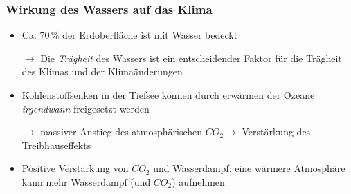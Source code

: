\begin{frame}
	\frametitle{Wirkung des Wassers auf das Klima}
	\begin{itemize}
	\item Ca. 70\,\% der Erdoberfläche ist mit Wasser bedeckt
	\item [$\rightarrow$] Die \textit{Trägheit} des Wassers ist ein entscheidender Faktor für die Trägheit des Klimas und der Klimaänderungen %
	\item Kohlenstoffsenken in der Tiefsee können durch erwärmen der Ozeane \textit{irgendwann} freigesetzt werden
	\item[$\rightarrow$] massiver Anstieg des atmosphärischen $CO_2 \rightarrow$ Verstärkung des Treibhauseffekts
	\item Positive Verstärkung von $CO_2$ und Wasserdampf: eine wärmere Atmosphäre kann mehr Wasserdampf (und $CO_2$) aufnehmen
	\end{itemize}
\end{frame}

